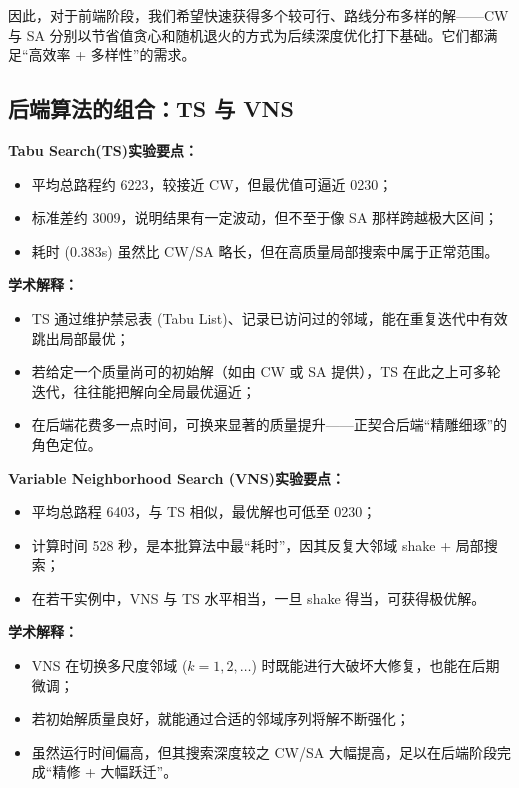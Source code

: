 \documentclass[12pt,a4paper,twoside]{ctexbook}
\begin{document}
因此，对于前端阶段，我们希望快速获得多个较可行、路线分布多样的解——CW 与 SA 分别以节省值贪心和随机退火的方式为后续深度优化打下基础。它们都满足“高效率 + 多样性”的需求。


\subsection{后端算法的组合：TS 与 VNS}
\textbf{Tabu Search(TS)实验要点：}
\begin{itemize}
    \item 平均总路程约 6223，较接近 CW，但最优值可逼近 0230；
    \item 标准差约 3009，说明结果有一定波动，但不至于像 SA 那样跨越极大区间；
    \item 耗时 (0.383s) 虽然比 CW/SA 略长，但在高质量局部搜索中属于正常范围。
\end{itemize}

\textbf{学术解释：}
\begin{itemize}
    \item TS 通过维护禁忌表 (Tabu List)、记录已访问过的邻域，能在重复迭代中有效跳出局部最优；
    \item 若给定一个质量尚可的初始解（如由 CW 或 SA 提供），TS 在此之上可多轮迭代，往往能把解向全局最优逼近；
    \item 在后端花费多一点时间，可换来显著的质量提升——正契合后端“精雕细琢”的角色定位。
\end{itemize}

\textbf{Variable Neighborhood Search (VNS)实验要点：}
\begin{itemize}
    \item 平均总路程 6403，与 TS 相似，最优解也可低至 0230；
    \item 计算时间 528 秒，是本批算法中最“耗时”，因其反复大邻域 shake + 局部搜索；
    \item 在若干实例中，VNS 与 TS 水平相当，一旦 shake 得当，可获得极优解。
\end{itemize}

\textbf{学术解释：}
\begin{itemize}
    \item VNS 在切换多尺度邻域 ($k=1,2,\dots$) 时既能进行大破坏大修复，也能在后期微调；
    \item 若初始解质量良好，就能通过合适的邻域序列将解不断强化；
    \item 虽然运行时间偏高，但其搜索深度较之 CW/SA 大幅提高，足以在后端阶段完成“精修 + 大幅跃迁”。
\end{itemize}
\end{document}
